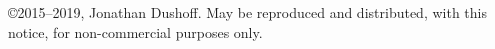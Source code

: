 \copyright 2015--2019, Jonathan Dushoff.  May be reproduced and distributed, with this notice, for non-commercial purposes only.
